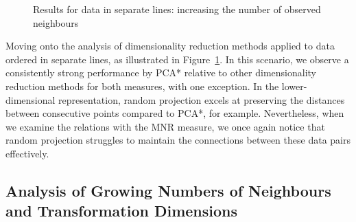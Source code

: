 \documentclass[pdftex,12pt,a4paper]{report}
\begin{document}
\begin{figure}[!htb]
    \caption{Results for data in separate lines: increasing the number of observed neighbours}\label{fig:num_neigh_seplines}
\end{figure}

Moving onto the analysis of dimensionality reduction methods applied to data ordered in separate lines, as illustrated in Figure~\ref{fig:num_neigh_seplines}.
In this scenario, we observe a consistently strong performance by PCA* relative to other dimensionality reduction methods for both measures, with one exception.
In the lower-dimensional representation, random projection excels at preserving the distances between consecutive points compared to PCA*, for example.
Nevertheless, when we examine the relations with the MNR measure, we once again notice that random projection struggles to maintain the connections between these data pairs effectively.

\FloatBarrier

\subsection{Analysis of Growing Numbers of Neighbours and Transformation Dimensions} \label{subsec:num_neigh_vs_dyn_low}
\end{document}
